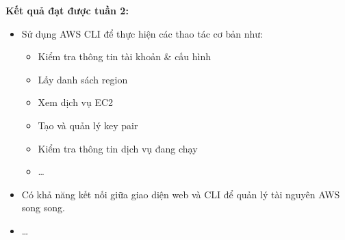 \vspace{0.5em}\noindent\textbf{Kết quả đạt được tuần
2:}\par

\begin{itemize}
\item
  Sử dụng AWS CLI để thực hiện các thao tác cơ bản như:

  \begin{itemize}
  \tightlist
  \item
    Kiểm tra thông tin tài khoản \& cấu hình
  \item
    Lấy danh sách region
  \item
    Xem dịch vụ EC2
  \item
    Tạo và quản lý key pair
  \item
    Kiểm tra thông tin dịch vụ đang chạy
  \item
    \ldots{}
  \end{itemize}
\item
  Có khả năng kết nối giữa giao diện web và CLI để quản lý tài nguyên
  AWS song song.
\item
  \ldots{}
\end{itemize}
